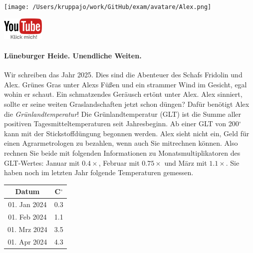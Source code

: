 \documentclass[a4paper, 9pt]{scrartcl}\usepackage[]{graphicx}\usepackage[]{xcolor}
\begin{document}
 
\ifcollection
\begin{flushright}
\tiny\vspace{-3Ex}
\textbf{\examinhaltstart}
\exammodulemathstat
\vspace{-4Ex}
\end{flushright}
\begin{minipage}[t]{0.5\textwidth}
\texttt{[image: /Users/kruppajo/work/GitHub/exam/avatare/Alex.png]}
\end{minipage}
\begin{minipage}[t]{0.5\textwidth}
\hfill
\href{https://youtu.be/fiWGgCX-cE4}{\includegraphics[width = 2cm]{img/youtube}}
\end{minipage}
\fi






\ifcollection
\paragraph{Lüneburger Heide. Unendliche Weiten.}
\fi



Wir schreiben das Jahr 2025. Dies sind die Abenteuer  des Schafs Fridolin und Alex. Grünes Gras unter Alexs Füßen und ein strammer Wind im Gesicht, egal wohin er schaut. Ein schmatzendes Geräusch ertönt unter Alex. Alex sinniert, sollte er seine weiten Graslandschaften jetzt schon düngen? Dafür benötigt Alex die \textit{Grünlandtemperatur}! Die Grünlandtemperatur (GLT) ist die Summe aller positiven Tagesmitteltemperaturen seit Jahresbeginn. Ab einer GLT von 200$^\circ$ kann mit der Stickstoffdüngung begonnen werden. Alex sieht nicht ein, Geld für einen Agrarmetrologen zu bezahlen, wenn auch Sie mitrechnen können. Also rechnen Sie beide mit folgenden Informationen zu Monatsmultiplikatoren des GLT-Wertes: Januar mit $0.4\times$, Februar mit $0.75\times$ und März mit
$1.1\times$. Sie haben noch im letzten Jahr folgende Temperaturen gemessen.

\begin{center}
\begin{tabular}{cc}
  \toprule
  Datum & C$^\circ$ \\
  \midrule
  01. Jan 2024 & 0.3\\
  01. Feb 2024 & 1.1\\
  01. Mrz 2024 & 3.5\\
  01. Apr 2024 & 4.3\\
  \bottomrule
\end{tabular}
\end{center}
\end{document}
